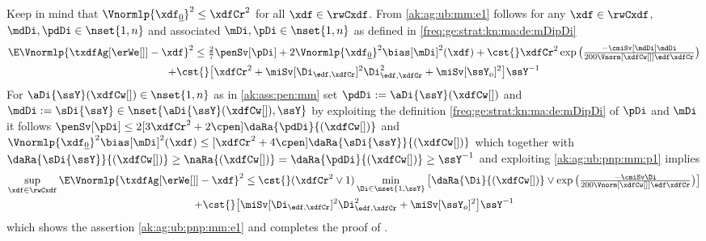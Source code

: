 \begin{pro}Keep in mind that
  $\Vnormlp{\xdf_{\underline{0}}}^2\leq\xdfCr^2$ for all $\xdf\in\rwCxdf$.
From
\eqref{ak:ag:ub:mm:e1} follows for any $\xdf\in\rwCxdf$, $\mdDi,\pdDi\in\nset{1,n}$ and associated
$\mDi,\pDi\in\nset{1,n}$ as defined in  \eqref{freq:ge:strat:kn:ma:de:mDipDi}%
 \begin{multline}\label{ak:ag:ub:pnp:mm:p1}
    \E\Vnormlp{\txdfAg[{\erWe[]}]-\xdf}^2\leq \tfrac{2}{7}\penSv[\pDi]
    +2\Vnormlp{\xdf_{\underline{0}}}^2\bias[\mDi]^2(\xdf)
 + \cst{}\xdfCr^2
 \exp\big(\tfrac{-\cmiSv[\mdDi]\mdDi}{200\Vnorm[{\xdfCw[]}]{\edf}\xdfCr}\big)%
\\ +\cst{}\big[%
 \xdfCr^2+\miSv[\Di_{\edf,\xdfCr}]^2\Di_{\edf,\xdfCr}^2+\miSv[\ssY_{o}]^2 \big]\ssY^{-1}%
\end{multline}
 For $\aDi{\ssY}(\xdfCw[])\in\nset{1,n}$
as in \ref{ak:ass:pen:mm}  set $\pdDi:=\aDi{\ssY}(\xdfCw[])$ and $\mdDi:=\sDi{\ssY}\in\nset{\aDi{\ssY}(\xdfCw[]),\ssY}$ by exploiting the definition
\eqref{freq:ge:strat:kn:ma:de:mDipDi} of $\pDi$ and $\mDi$ it follows
$\penSv[\pDi] \leq 2[3\xdfCr^2+ 2\cpen]
\daRa{\pdDi}{(\xdfCw[])}$ and 
$\Vnormlp{\xdf_{\underline{0}}}^2\bias[\mDi]^2(\xdf)\leq
      [\xdfCr^2+4\cpen]\daRa{\sDi{\ssY}}{(\xdfCw[])}$
which together with
$\daRa{\sDi{\ssY}}{(\xdfCw[])}\geq\naRa{(\xdfCw[])}=\daRa{\pdDi}{(\xdfCw[])}\geq\ssY^{-1}$
and exploiting 
\eqref{ak:ag:ub:pnp:mm:p1} implies%
 \begin{multline}\label{ak:ag:ub:pnp:mm:p2}
   \sup_{\xdf\in\rwCxdf}\E\Vnormlp{\txdfAg[{\erWe[]}]-\xdf}^2%
    \leq 
   \cst{}(\xdfCr^2\vee1)\min_{\Di\in\nset{1,\ssY}}\big[\daRa{\Di}{(\xdfCw[])}\vee\exp\big(\tfrac{-\cmiSv\Di}{200\Vnorm[{\xdfCw[]}]{\edf}\xdfCr}\big)\big]\\
   +\cst{}\big[\miSv[\Di_{\edf,\xdfCr}]^2\Di_{\edf,\xdfCr}^2+\miSv[\ssY_{o}]^2 \big]\ssY^{-1}
\end{multline}
which shows the assertion \eqref{ak:ag:ub:pnp:mm:e1} and  completes the
proof of .\proEnd\end{pro}
